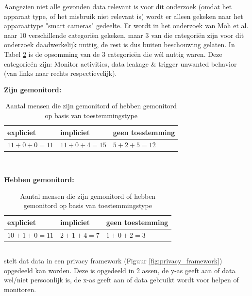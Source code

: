 \documentclass[nonacm,sigconf]{acmart}
\begin{document}
    Aangezien niet alle gevonden data relevant is voor dit onderzoek (omdat het apparaat type, of het misbruik niet relevant is) wordt er alleen gekeken naar het apparaattype "smart cameras" gedeelte.
    Er wordt in het onderzoek van Moh et al. naar 10 verschillende categoriën gekeken, maar 3 van die categoriën zijn voor dit onderzoek daadwerkelijk nuttig, de rest is dus buiten beschouwing gelaten.
    In Tabel \ref{table:moh} is de opsomming van de 3 categorieën die wél nuttig waren.
    Deze categorieén zijn: Monitor activities, data leakage & trigger unwanted behavior (van links naar rechts respectievelijk).

    \begin{table}[h]
        \raggedright\textbf{Zijn gemonitord:}
        \begin{tabularx}{\columnwidth}{|X|X|X|}
            \hline
            expliciet & impliciet & geen toestemming\\
            \hline
            $11+0+0 = 11$ & $11+0+4 = 15$ & $5+2+5 = 12$\\
            \hline
        \end{tabularx}
        \vspace{0.01cm}
        \\
        \raggedright\textbf{Hebben gemonitord:}
        \begin{tabularx}{\columnwidth}{|X|X|X|}
            \hline
            expliciet & impliciet & geen toestemming\\
            \hline
            $10+1+0 = 11$ & $2+1+4 = 7$ & $1+0+2 = 3$\\
            \hline
        \end{tabularx}
        \caption{Aantal mensen die zijn gemonitord of hebben gemonitord op basis van toestemmingstype \parencite{moh2023characterizing}}
       \label{table:moh}
    \end{table}


    \subsection{}
    \parencite{van2016privacy} stelt dat data in een privacy framework (Figuur \ref{fig:privacy_framework}) opgedeeld kan worden.
    Deze is opgedeeld in 2 assen, de y-as geeft aan of data wel/niet persoonlijk is, de x-as geeft aan of data gebruikt wordt voor helpen of monitoren.
\end{document}
